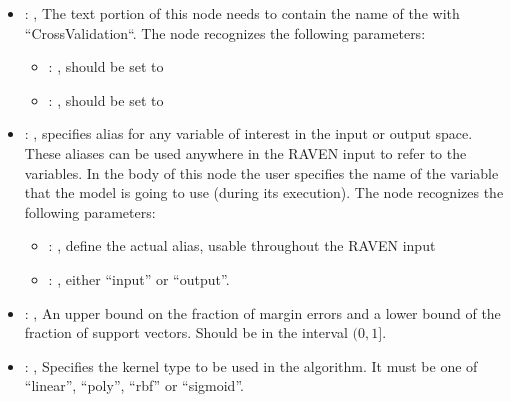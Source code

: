 \begin{itemize}
\begin{itemize}
        \item {}: ,
          List of IDs of features/variables to include in the transformation process.

        \item {}: ,
          Which space to search? Target or Feature?
      \end{itemize}

    \item {}: ,
      The text portion of this node needs to contain the name of the  with
               ``CrossValidation``.
      The  node recognizes the following parameters:
        \begin{itemize}
          \item {}: ,
            should be set to 
          \item {}: ,
            should be set to 
      \end{itemize}

    \item {}: ,
      specifies alias for         any variable of interest in the input or output space. These
      aliases can be used anywhere in the RAVEN input to         refer to the variables. In the body
      of this node the user specifies the name of the variable that the model is going to use
      (during its execution).
      The  node recognizes the following parameters:
        \begin{itemize}
          \item {}: ,
            define the actual alias, usable throughout the RAVEN input
          \item {}: ,
            either ``input'' or ``output''.
      \end{itemize}

    \item {}: ,
      An upper bound on the fraction of margin errors and
      a lower bound of the fraction of support vectors. Should be in the interval $(0, 1]$.

    \item {}: ,
      Specifies the kernel type to be used in the algorithm. It must be one of
      ``linear'', ``poly'', ``rbf'' or ``sigmoid''.


\end{itemize}
